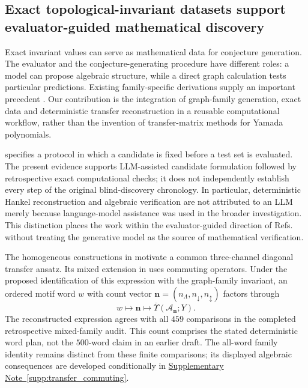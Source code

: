 \documentclass[10pt,twocolumn]{article}
\providecommand{\SuppSubsecref}[1]{\hyperref[#1]{Supplementary Note~\ref*{#1}}}
\begin{document}
\subsection{Exact topological-invariant datasets support evaluator-guided mathematical discovery}
\label{sec:mathematical_discovery}
Exact invariant values can serve as mathematical data for conjecture generation. The evaluator and the conjecture-generating procedure have different roles: a model can propose algebraic structure, while a direct graph calculation tests particular predictions. Existing family-specific derivations supply an important precedent \cite{kg_dobrynin1996yamada,kg_li2018yamada,kg_lundstrom2022transfer}. Our contribution is the integration of graph-family generation, exact data and deterministic transfer reconstruction in a reusable computational workflow, rather than the invention of transfer-matrix methods for Yamada polynomials.

 specifies a protocol in which a candidate is fixed before a test set is evaluated. The present evidence supports LLM-assisted candidate formulation followed by retrospective exact computational checks; it does not independently establish every step of the original blind-discovery chronology. In particular, deterministic Hankel reconstruction and algebraic verification are not attributed to an LLM merely because language-model assistance was used in the broader investigation. This distinction places the work within the evaluator-guided direction of Refs.~\cite{kg_funsearch2024,kg_alphaevolve2025,kg_georgiev2025mathematical} without treating the generative model as the source of mathematical verification.

The homogeneous constructions in  motivate a common three-channel diagonal transfer ansatz. Its mixed extension in  uses commuting operators. Under the proposed identification of this expression with the graph-family invariant, an ordered motif word $w$ with count vector $\mathbf n=(n_\Lambda,n_\downarrow,n_\updownarrow)$ factors through
\begin{equation}
w\longmapsto\mathbf n\longmapsto\overline{\Upsilon}(\mathcal A_{\mathbf n};Y).
\label{eq:main_abelianization}
\end{equation}
The reconstructed expression agrees with all $459$ comparisons in the completed retrospective mixed-family audit. This count comprises the stated deterministic word plan, not the $500$-word claim in an earlier draft. The all-word family identity remains distinct from these finite comparisons; its displayed algebraic consequences are developed conditionally in \SuppSubsecref{supp:transfer_commuting}.
\end{document}
